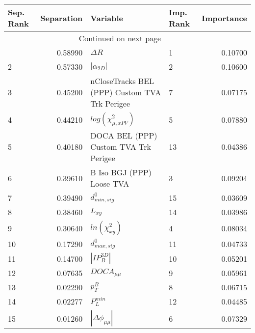 \usepackage{lscape}

\begin{landscape}
\begin{longtable}{lrllr}
\toprule
Sep. Rank &  Separation &                                       Variable & Imp. Rank &  Importance \\
\midrule
\endhead
\midrule
\multicolumn{3}{r}{{Continued on next page}} \\
\midrule
\endfoot

\bottomrule
\endlastfoot
        1 &     0.58990 &                                     $\Delta R$ &         1 &     0.10700 \\
        2 &     0.57330 &                                $|\alpha_{2D}|$ &         2 &     0.10600 \\
        3 &     0.45200 &  nCloseTracks BEL (PPP) Custom TVA Trk Perigee &         7 &     0.07175 \\
        4 &     0.44210 &                      $log(\chi^{2}_{\mu,xPV})$ &         5 &     0.07880 \\
        5 &     0.40180 &          DOCA BEL (PPP) Custom TVA Trk Perigee &        13 &     0.04386 \\
        6 &     0.39610 &                      B Iso BGJ (PPP) Loose TVA &         3 &     0.09204 \\
        7 &     0.39490 &                               $d^0_{min, sig}$ &        15 &     0.03609 \\
        8 &     0.38460 &                                       $L_{xy}$ &        14 &     0.03986 \\
        9 &     0.30640 &                            $ln(\chi^{2}_{xy})$ &         4 &     0.08034 \\
       10 &     0.17290 &                               $d^0_{max, sig}$ &        11 &     0.04733 \\
       11 &     0.14700 &                                $|IP_{B}^{3D}|$ &        10 &     0.05201 \\
       12 &     0.07635 &                                $DOCA_{\mu\mu}$ &         9 &     0.05961 \\
       13 &     0.02290 &                                      $p^B_{T}$ &         8 &     0.06715 \\
       14 &     0.02277 &                                  $P^{min}_{L}$ &        12 &     0.04485 \\
       15 &     0.01260 &                       $|\Delta \phi_{\mu\mu}|$ &         6 &     0.07329 \\
\end{longtable}

\end{landscape}
